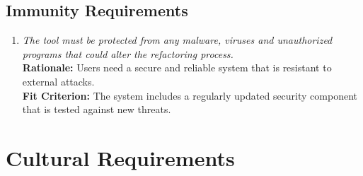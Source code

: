 \documentclass[12pt]{article}
\begin{document}
\subsection{Immunity Requirements}
\begin{enumerate}[label=SR-AUR \arabic*., wide=0pt, leftmargin=*]
	\item \emph{The tool must be protected from any malware, viruses and unauthorized programs that could alter the refactoring process. }\\
    {\bf Rationale:} Users need a secure and reliable system that is resistant to external attacks.\\
    {\bf Fit Criterion:} The system includes a regularly updated security component that is tested against new threats.
\end{enumerate}

\section{Cultural Requirements}
\end{document}
